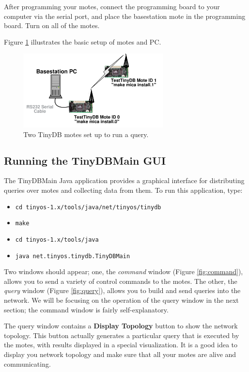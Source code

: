 \documentclass[11pt]{article}
\newcommand{\java}{tinyos-1.x/tools/java}
\begin{document}
After programming your motes, connect the programming
board to your computer via the serial
port, and place the basestation mote in the programming
board.  Turn on all of the motes.

Figure \ref{fig:setup} illustrates the basic setup of motes and PC.  

\begin{figure}[h]
\centering\leavevmode\includegraphics[width=3in]{setup}
\caption{Two TinyDB motes set up to run a query.}
\label{fig:setup}
\end{figure}


\subsection{Running the TinyDBMain GUI}
\label{sec:GUI}
The TinyDBMain Java application provides a graphical interface for distributing queries 
over motes and collecting data from them.  To run this application, type:

\begin{itemize}
\item {\tt cd {\java}/net/tinyos/tinydb}
\item {\tt make}
\item {\tt cd {\java}}
\item {\tt java net.tinyos.tinydb.TinyDBMain}
\end{itemize}

Two windows should appear; one, the {\it command} window (Figure
\ref{fig:command}), allows you to send a variety of control commands
to the motes.  The other, the {\it query} window (Figure
\ref{fig:query}), allows you to build and send queries into the
network.  We will be focusing on the operation of the query window in
the next section; the command window is fairly self-explanatory.

The query window contains a {\bf Display Topology} button to show the
network topology. This button actually generates a particular query
that is executed by the motes, with results displayed in a special
visualization.  It is a good idea to display you network topology and
make sure that all your motes are alive and communicating.
\end{document}
